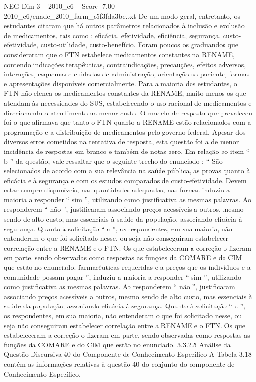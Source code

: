 \begin{textsample}{NEG Dim 3 – 2010\_c6 – Score -7.00 – 2010\_c6/enade\_2010\_farm\_c5f3fda3be.txt}
De um modo geral, entretanto, os estudantes citaram que há outros parâmetros relacionados à inclusão e exclusão de medicamentos, tais como : eficácia, efetividade, eficiência, segurança, custo-efetividade, custo-utilidade, custo-benefício.
Foram poucos os graduandos que consideraram que o FTN estabelece medicamentos constantes na RENAME, contendo indicações terapêuticas, contraindicações, precauções, efeitos adversos, interações, esquemas e cuidados de administração, orientação ao paciente, formas e apresentações disponíveis comercialmente.
Para a maioria dos estudantes, o FTN não elenca os medicamentos constantes da RENAME, muito menos os que atendam às necessidades do SUS, estabelecendo o uso racional de medicamentos e direcionando o atendimento ao menor custo.
O modelo de resposta que prevaleceu foi o que afirmava que tanto o FTN quanto a RENAME estão relacionados com a programação e a distribuição de medicamentos pelo governo federal.
Apesar dos diversos erros cometidos na tentativa de resposta, esta questão foi a de menor incidência de respostas em branco e também de notas zero.
Em relação ao item “ b ” da questão, vale ressaltar que o seguinte trecho do enunciado : “ São selecionados de acordo com a sua relevância na saúde pública, as provas quanto à eficácia e à segurança e com os estudos comparados de custo-efetividade.
Devem estar sempre disponíveis, nas quantidades adequadas, nas formas induziu a maioria a responder “ sim ”, utilizando como justificativa as mesmas palavras.
Ao responderem “ não ”, justificaram associando preços acessíveis a outros, mesmo sendo de alto custo, mas essenciais à saúde da população, associando eficácia à segurança.
Quanto à solicitação “ c ”, os respondentes, em sua maioria, não entenderam o que foi solicitado nesse, ou seja não conseguiram estabelecer correlação entre a RENAME e o FTN.
Os que estabeleceram a correção o fizeram em parte, sendo observadas como respostas as funções da COMARE e do CIM que estão no enunciado. farmacêuticas requeridas e a preços que os indivíduos e a comunidade possam pagar ”, induziu a maioria a responder “ sim ”, utilizando como justificativa as mesmas palavras.
Ao responderem “ não ”, justificaram associando preços acessíveis a outros, mesmo sendo de alto custo, mas essenciais à saúde da população, associando eficácia à segurança.
Quanto à solicitação “ c ”, os respondentes, em sua maioria, não entenderam o que foi solicitado nesse, ou seja não conseguiram estabelecer correlação entre a RENAME e o FTN.
Os que estabeleceram a correção o fizeram em parte, sendo observadas como respostas as funções da COMARE e do CIM que estão no enunciado. 3.3.2.5 Análise da Questão Discursiva 40 do Componente de Conhecimento Específico A Tabela 3.18 contém as informações relativas à questão 40 do conjunto do componente de Conhecimento Específico.

\end{textsample}
